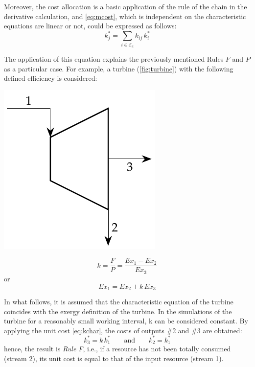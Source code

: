 \documentclass[energies,article,submit,moreauthors,pdftex]{Definitions/mdpi}
\begin{document}
Moreover, the cost allocation is a basic application of the rule of the chain in the derivative calculation, and \cref{eq:mcost}, which is independent on the characteristic equations are linear or not, could be expressed as follows:
\begin{equation}
k_{j}^{*}=\sum_{i\in\mathcal{E}_u}{k_{ij}\,k_{i}^{*}}
\label{eq:kchar}
\end{equation}

The application of this equation explains the previously mentioned Rules $F$ and $P$ as a particular case. For example, a turbine (\cref{fig:turbine}) with the following defined efficiency is considered: 
\begin{center}
  \begin{minipage}[c]{0.50\linewidth}
   \centering
    \includegraphics[scale=0.7]{turbine}
  \end{minipage}
  \begin{minipage}[c]{0.48\linewidth}
    \centering
    \begin{equation*}
        k=\frac{F}{P}=\frac{Ex_1 - Ex_2}{Ex_3}
        \label{eq:turb}
    \end{equation*}
    or
    \begin{equation*}
        Ex_1=Ex_2+k\,Ex_3
    \end{equation*}
  \end{minipage}
  \label{fig:turbine}
\end{center}

In what follows, it is assumed that the characteristic equation of the turbine coincides with the exergy definition of the turbine. In the simulations of the turbine for a reasonably small working interval, k can be considered constant. By applying the unit cost \cref{eq:kchar}, the costs of outputs \#2 and \#3 are obtained:
\begin{equation}
    k_3^*=k\,k_1^* \qquad\text{and}\qquad k_2^*=k_1^*
\end{equation}
hence, the result is \emph{Rule F}, i.e., if a resource has not been totally consumed (stream 2), its unit cost is equal to that of the input resource (stream 1).                    
\end{document}
